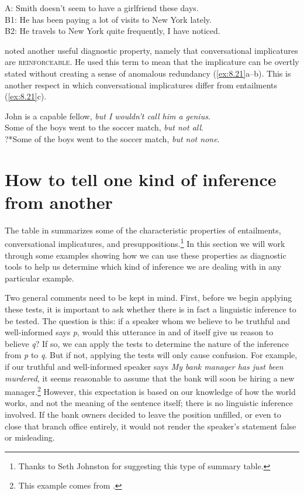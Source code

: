 \ea \label{ex:8.20}
A: Smith doesn’t seem to have a girlfriend these days.\\
B1: He has been paying a lot of visits to New York lately.\\
B2: He travels to New York quite frequently, I have noticed.
\z


\citet[294]{Sadock1978} noted another useful diagnostic property, namely that conversational implicatures are \textsc{reinforceable}. He used this term to mean that the implicature can be overtly stated without creating a sense of anomalous redundancy (\ref{ex:8.21}a--b). This is another respect in which conversational implicatures differ from entailments (\ref{ex:8.21}c).


\ea \label{ex:8.21}
\ea John is a capable fellow, \textit{but I wouldn’t call him a genius}.\\
\ex Some of the boys went to the soccer match, \textit{but not all}.\\
\ex ?*Some of the boys went to the soccer match, \textit{but not none}.
                       \z
\z

\section{How to tell one kind of inference from another}\label{sec:} %

The table in  summarizes some of the characteristic properties of entailments, conversational implicatures, and presuppositions.\footnote{Thanks to Seth Johnston for suggesting this type of summary table.} In this section we will work through some examples showing how we can use these properties as diagnostic tools to help us determine which kind of inference we are dealing with in any particular example.



Two general comments need to be kept in mind. First, before we begin applying these tests, it is important to ask whether there is in fact a linguistic inference to be tested. The question is this: if a speaker whom we believe to be truthful and well-informed says \textit{p}, would this utterance in and of itself give us reason to believe \textit{q}? If so, we can apply the tests to determine the nature of the inference from \textit{p} to \textit{q}. But if not, applying the tests will only cause confusion. For example, if our truthful and well-informed speaker says \textit{My bank manager has just been murdered}, it seems reasonable to assume that the bank will soon be hiring a new manager.\footnote{This example comes from \citet[54]{Saeed2009}.} However, this expectation is based on our knowledge of how the world works, and not the meaning of the sentence itself; there is no linguistic inference involved. If the bank owners decided to leave the position unfilled, or even to close that branch office entirely, it would not render the speaker’s statement false or misleading.



